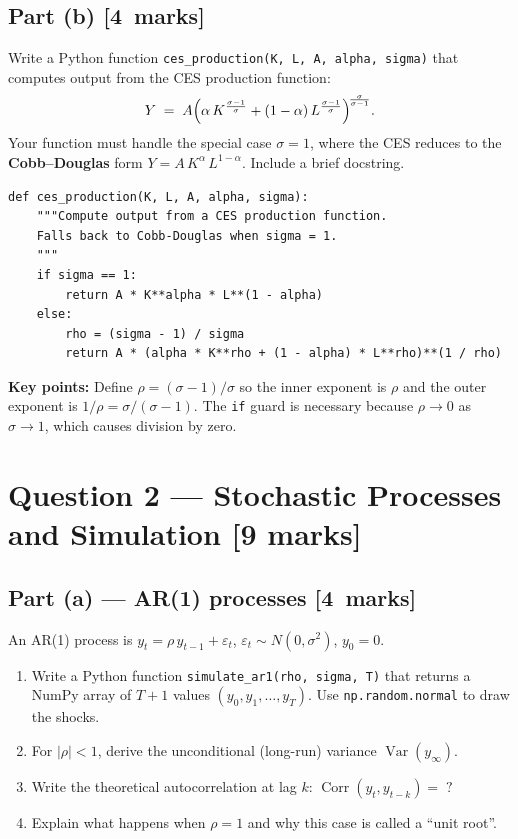 \documentclass[11pt,a4paper]{article}
\newcommand{\mkpts}[1]{\hfill\textbf{[#1~marks]}}
\begin{document}
\subsection*{Part (b) \mkpts{4}}

Write a Python function \texttt{ces\_production(K, L, A, alpha, sigma)} that computes output from the CES production function:
\[
Y \;=\; A\Bigl(\alpha\, K^{\frac{\sigma-1}{\sigma}} + (1-\alpha)\, L^{\frac{\sigma-1}{\sigma}}\Bigr)^{\!\frac{\sigma}{\sigma-1}}.
\]
Your function must handle the special case $\sigma = 1$, where the CES reduces to the \textbf{Cobb--Douglas} form $Y = A\,K^{\alpha}\,L^{1-\alpha}$.  Include a brief docstring.

\begin{solution}
\begin{lstlisting}[numbers=none]
def ces_production(K, L, A, alpha, sigma):
    """Compute output from a CES production function.
    Falls back to Cobb-Douglas when sigma = 1.
    """
    if sigma == 1:
        return A * K**alpha * L**(1 - alpha)
    else:
        rho = (sigma - 1) / sigma
        return A * (alpha * K**rho + (1 - alpha) * L**rho)**(1 / rho)
\end{lstlisting}

\textbf{Key points:} Define $\rho = (\sigma-1)/\sigma$ so the inner exponent is $\rho$ and the outer exponent is $1/\rho = \sigma/(\sigma-1)$.  The \texttt{if} guard is necessary because $\rho\to 0$ as $\sigma\to 1$, which causes division by zero.
\end{solution}


\newpage

\section*{Question 2 --- Stochastic Processes and Simulation \hfill [9 marks]}

\subsection*{Part (a) --- AR(1) processes \mkpts{4}}

An AR(1) process is $y_t = \rho\, y_{t-1} + \varepsilon_t$, \; $\varepsilon_t \sim N(0,\sigma^2)$, \; $y_0=0$.

\begin{enumerate}[label=(\roman*),nosep]
\item Write a Python function \texttt{simulate\_ar1(rho, sigma, T)} that returns a NumPy array of $T{+}1$ values $(y_0, y_1, \dots, y_T)$.  Use \texttt{np.random.normal} to draw the shocks.
\item For $|\rho| < 1$, derive the unconditional (long-run) variance $\operatorname{Var}(y_\infty)$.
\item Write the theoretical autocorrelation at lag $k$: $\operatorname{Corr}(y_t, y_{t-k}) = \;?$
\item Explain what happens when $\rho = 1$ and why this case is called a ``unit root''.
\end{enumerate}
\end{document}
